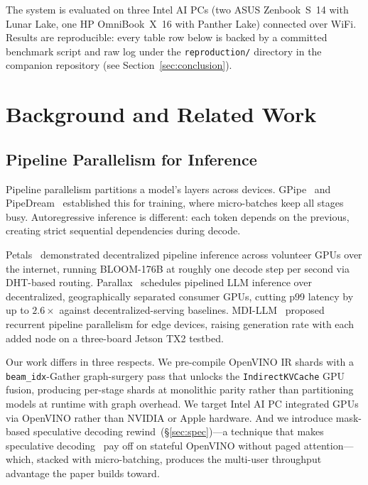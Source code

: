 \documentclass[11pt]{article}
\newcommand{\brk}{\discretionary{}{}{}}
\begin{document}
The system is evaluated on three Intel AI PCs (two ASUS Zenbook~S~14 with Lunar Lake, one HP OmniBook~X~16 with Panther Lake) connected over WiFi. Results are reproducible: every table row below is backed by a committed benchmark script and raw log under the \texttt{reproduction/} directory in the companion repository (see Section~\ref{sec:conclusion}).

\section{Background and Related Work}
\label{sec:related}

\subsection{Pipeline Parallelism for Inference}

Pipeline parallelism partitions a model's layers across devices. GPipe~\cite{huang2019gpipe} and PipeDream~\cite{narayanan2019pipedream} established this for training, where micro-batches keep all stages busy. Autoregressive inference is different: each token depends on the previous, creating strict sequential dependencies during decode.

Petals~\cite{borzunov2023petals} demonstrated decentralized pipeline inference across volunteer GPUs over the internet, running BLOOM-176B at roughly one decode step per second via DHT-based routing. Parallax~\cite{tong2025parallax} schedules pipelined LLM inference over decentralized, geographically separated consumer GPUs, cutting p99 latency by up to $2.6\times$ against decentralized-serving baselines. MDI-LLM~\cite{macario2025mdillm} proposed recurrent pipeline parallelism for edge devices, raising generation rate with each added node on a three-board Jetson TX2 testbed.

Our work differs in three respects. We pre-compile OpenVINO IR shards with a \texttt{beam\_idx}-Gather graph-surgery pass that unlocks the \texttt{Indirect\brk KVCache} GPU fusion, producing per-stage shards at monolithic parity rather than partitioning models at runtime with graph overhead. We target Intel AI PC integrated GPUs via OpenVINO rather than NVIDIA or Apple hardware. And we introduce mask-based speculative decoding rewind~(\S\ref{sec:spec})---a technique that makes speculative decoding~\cite{leviathan2023fast, chen2023accelerating} pay off on stateful OpenVINO without paged attention---which, stacked with micro-batching, produces the multi-user throughput advantage the paper builds toward.
\end{document}
